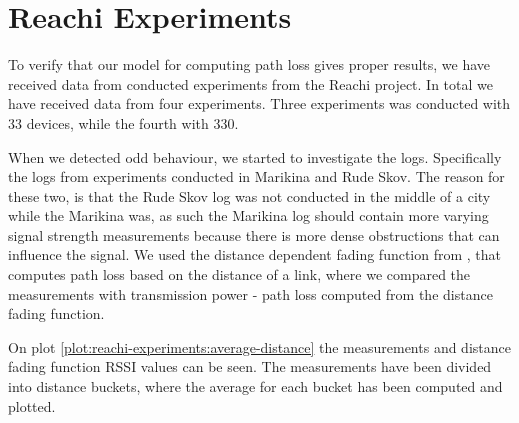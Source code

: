 \section{Reachi Experiments}\label{sec:linkmodel}
To verify that our model for computing path loss gives proper results, we have received data from conducted
experiments from the Reachi project. In total we have received data from four experiments. Three experiments
was conducted with 33 devices, while the fourth with 330.

When we detected odd behaviour, we started to investigate the logs. Specifically the logs from experiments
conducted in Marikina and Rude Skov. The reason for these two, is that the Rude Skov log was not conducted in
the middle of a city while the Marikina was, as such the Marikina log should contain more varying signal
strength measurements because there is more dense obstructions that can influence the signal. We used the
distance dependent fading function from \cite{paper:linkmodel}, that computes path loss based on the distance
of a link, where we compared the measurements with transmission power - path loss computed from the distance
fading function.

On plot \ref{plot:reachi-experiments:average-distance} the measurements and distance fading function RSSI
values can be seen. The measurements have been divided into distance buckets, where the average for each
bucket has been computed and plotted.

